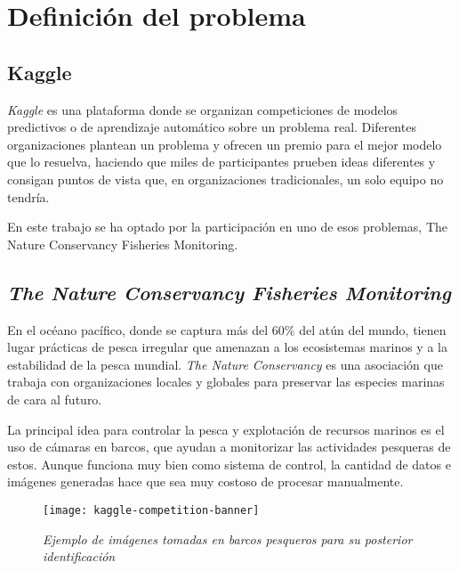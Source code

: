 
\chapter{Definición del problema}

\label{Chapter5} %


\section{Kaggle}

\textit{Kaggle }es una plataforma donde se organizan competiciones de modelos predictivos o de aprendizaje automático sobre un problema real. Diferentes organizaciones plantean un problema y ofrecen un premio para el mejor modelo que lo resuelva, haciendo que miles de participantes prueben ideas diferentes y consigan puntos de vista que, en organizaciones tradicionales, un solo equipo no tendría.

En este trabajo se ha optado por la participación en uno de esos problemas, The Nature Conservancy Fisheries Monitoring.

\section{\textit{ The Nature Conservancy Fisheries Monitoring }}

En el océano pacífico, donde se captura más del 60\% del atún del mundo, tienen lugar prácticas de pesca irregular que amenazan a los ecosistemas marinos y a la estabilidad de la pesca mundial. \textit{The Nature Conservancy} es una asociación que trabaja con organizaciones locales y globales para preservar las especies marinas de cara al futuro.

La principal idea para controlar la pesca y explotación de recursos marinos es el uso de cámaras en barcos, que ayudan a monitorizar las actividades pesqueras de estos. Aunque funciona muy bien como sistema de control, la cantidad de datos e imágenes generadas hace que sea muy costoso de procesar manualmente.

\begin{figure}
  \centering
  \caption{\textit{Ejemplo de imágenes tomadas en barcos pesqueros para su posterior identificación}}
\label{kaggle-banner}
  \texttt{[image: kaggle-competition-banner]}
\end{figure}

